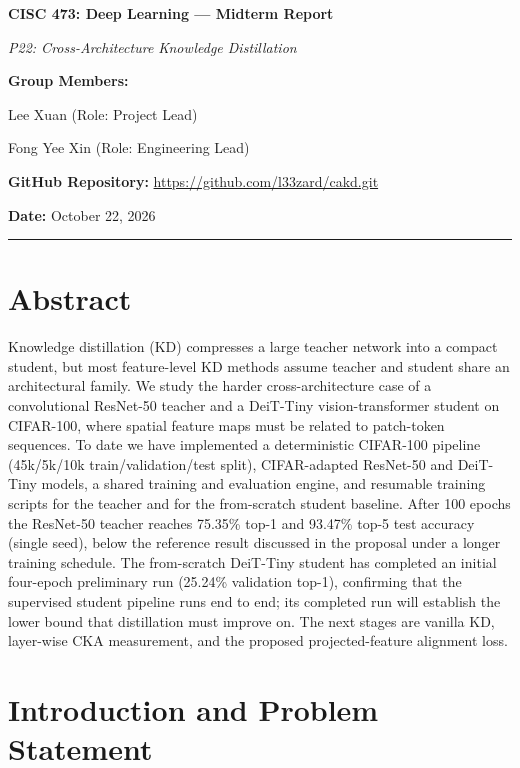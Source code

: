 \documentclass[11pt, letterpaper]{article}
\begin{document}
{\centering
  {\Large\textbf{CISC 473: Deep Learning --- Midterm Report}}\par\vspace{0.5em}
  {\large\textit{P22: Cross-Architecture Knowledge Distillation}}\par\vspace{0.4em}
  \textbf{Group Members:}\par
  Lee Xuan  \quad (Role: Project Lead)\par
  Fong Yee Xin  \quad (Role: Engineering Lead)\par
  \textbf{GitHub Repository:} \url{https://github.com/l33zard/cakd.git}\par\vspace{0.3em}
  \textbf{Date:} October 22, 2026\par\vspace{0.4em}
  \rule{\linewidth}{0.4pt}
}

\section{Abstract}

Knowledge distillation (KD) compresses a large teacher network into a compact
student, but most feature-level KD methods assume teacher and student share an
architectural family. We study the harder cross-architecture case of a
convolutional ResNet-50 teacher and a DeiT-Tiny vision-transformer student on
CIFAR-100, where spatial feature maps must be related to patch-token
sequences. To date we have implemented a deterministic CIFAR-100 pipeline
(45k/5k/10k train/validation/test split), CIFAR-adapted ResNet-50 and
DeiT-Tiny models, a shared training and evaluation engine, and resumable
training scripts for the teacher and for the from-scratch student baseline.
After 100 epochs the ResNet-50 teacher reaches 75.35\% top-1 and 93.47\%
top-5 test accuracy (single seed), below the reference result discussed in the
proposal under a longer training schedule.
The from-scratch DeiT-Tiny student has completed an initial four-epoch
preliminary run (25.24\% validation top-1), confirming that the supervised
student pipeline runs end to end; its completed run will establish the lower
bound that distillation must improve on. The next stages are vanilla KD,
layer-wise CKA measurement, and the proposed projected-feature alignment loss.

\section{Introduction and Problem Statement}
\end{document}
